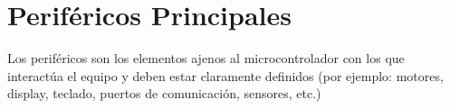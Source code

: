\section{Periféricos Principales}
\color{blue}Los periféricos son los elementos ajenos al microcontrolador con los que interactúa el equipo y deben estar claramente definidos (por ejemplo: motores, display, teclado, puertos de comunicación, sensores, etc.)\\ \color{black}
    
